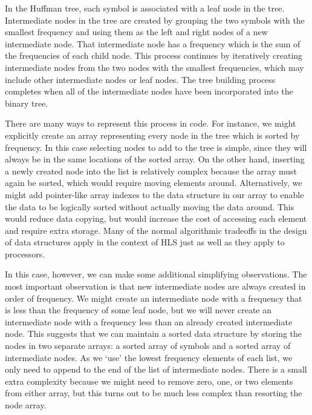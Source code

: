 In the Huffman tree, each symbol is associated with a leaf node in the tree.  Intermediate nodes in the tree are created by grouping the two symbols with the smallest frequency and using them as the left and right nodes of a new intermediate node. That intermediate node has a frequency which is the sum of the frequencies of each child node. This process continues by iteratively creating intermediate nodes from the two nodes with the smallest frequencies, which may include other intermediate nodes or leaf nodes.  The tree building process completes when all of the intermediate nodes have been incorporated into the binary tree.

There are many ways to represent this process in code.  For instance, we might explicitly create an array representing every node in the tree which is sorted by frequency.  In this case selecting nodes to add to the tree is simple, since they will always be in the same locations of the sorted array.  On the other hand, inserting a newly created node into the list is relatively complex because the array must again be sorted, which would require moving elements around.  Alternatively, we might add pointer-like array indexes to the data structure in our array to enable the data to be logically sorted without actually moving the data around.  This would reduce data copying, but would increase the cost of accessing each element and require extra storage.  Many of the normal algorithmic tradeoffs in the design of data structures apply in the context of HLS just as well as they apply to processors.

In this case, however, we can make some additional simplifying observations.  The most important observation is that new intermediate nodes are always created in order of frequency.  We might create an intermediate node with a frequency that is less than the frequency of some leaf node, but we will never create an intermediate node with a frequency less than an already created intermediate node.  This suggests that we can maintain a sorted data structure by storing the nodes in two separate arrays: a sorted array of symbols and a sorted array of intermediate nodes.  As we `use' the lowest frequency elements of each list, we only need to append to the end of the list of intermediate nodes.  There is a small extra complexity because we might need to remove zero, one, or two elements from either array, but this turns out to be much less complex than resorting the node array.

